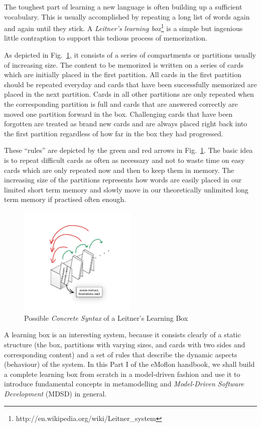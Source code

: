 \genHeader


The toughest part of learning a new language  is often building up a sufficient vocabulary. This is usually accomplished by repeating a long list of words again
and again until they stick. A \emph{Leitner's learning box}\footnote{http://en.wikipedia.org/wiki/Leitner\_system} is a simple but ingenious little contraption
to support this tedious process of memorization.

As depicted in Fig.~\ref{fig:membox_illustration}, it consists of a series of compartments or partitions usually of increasing size. The content to be memorized
is written on a series of cards  which are initially placed in the first partition. All cards in the first  partition should be repeated everyday and cards that
have been successfully memorized are placed in the next partition. Cards in all other partitions are only repeated when the corresponding partition is full and
cards that are  answered correctly are moved one partition forward in the box. Challenging  cards that have been forgotten are treated as brand new cards and
are always  placed right back into the first partition regardless of how far in the box they  had progressed.

These ``rules'' are depicted by the green and red arrows in Fig.~\ref{fig:membox_illustration}. The basic idea is to repeat difficult cards as often as
necessary and not to waste time on easy cards which are only repeated now and then to keep them in memory. The increasing size of the partitions represents how
words are easily placed in our limited short term memory and slowly move in our theoretically unlimited long term memory if practised often enough.

 \begin{figure}[htp]
 \begin{center}
   \includegraphics[width=0.5\textwidth]{../membox_illustration}
   \caption[]{Possible \emph{Concrete Syntax} of a Leitner's Learning Box}
   \label{fig:membox_illustration}
 \end{center}
 \end{figure}
 \FloatBarrier

A learning box is an interesting system, because it consists clearly of a static structure (the box, partitions with varying sizes, and cards with two sides and
corresponding content) and a set of rules that describe the dynamic aspects (behaviour) of the system. In this Part I of the eMoflon handbook, we shall build a 
complete learning box from scratch in a model-driven fashion and use it to introduce fundamental concepts in metamodelling and \emph{Model-Driven Software 
Development} (MDSD) in general.
